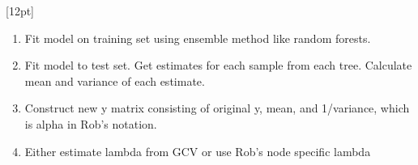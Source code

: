 [12pt]



\begin{enumerate}
\item Fit model on training set using ensemble method like random
forests.
\item Fit model to test set.  Get estimates for each sample from each
tree.  Calculate mean and variance of each estimate.
\item Construct new y matrix consisting of original y, mean, and
1/variance, which is alpha in Rob's notation.
\item Either estimate lambda from GCV or use Rob's node specific lambda
\end{enumerate}




